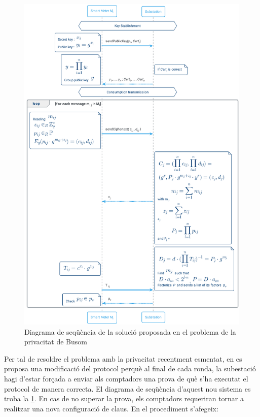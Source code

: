 \begin{figure}[H]
	\centering
	\includegraphics[width=13cm]{umls/garra.png}
	\caption{Diagrama de seqüència de la solució proposada en el problema de la privacitat de Busom}
	\label{fig:garra}
\end{figure}
\newpage
Per tal de resoldre el problema amb la privacitat recentment esmentat, en \cite{repair-busom} es proposa una modificació del protocol perquè al final de cada ronda, la subestació hagi d'estar forçada a enviar als comptadors una prova de què s'ha executat el protocol de manera correcta. El diagrama de seqüència d'aquest nou sistema es troba la \cref{fig:garra}. En cas de no superar la prova, els comptadors requeriran tornar a realitzar una nova configuració de claus. En el procediment s'afegeix:
